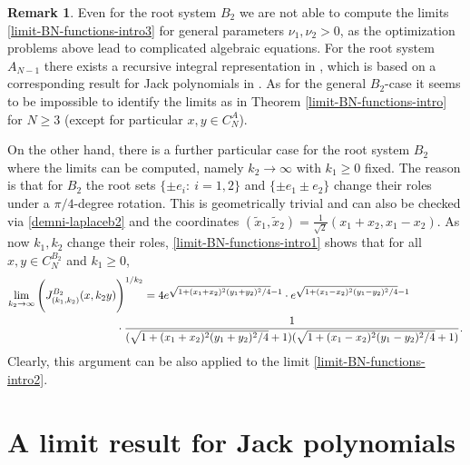\documentclass[reqno]{amsart}
\theoremstyle{plain}
\theoremstyle{definition}
\newtheorem{remark}[theorem]{Remark}
\numberwithin{equation}{section}
\begin{document}
\begin{remark} Even for the root system $B_2$ we are not able to compute the limits \eqref{limit-BN-functions-intro3}
 for general parameters $\nu_1,\nu_2>0$, as the optimization problems above lead to complicated algebraic equations.
 For the root system $A_{N-1}$ there exists a recursive integral representation in \cite{Amri},
 which is based on a corresponding result 
 for Jack polynomials in \cite{OO}. As for the general $B_2$-case it seems to be impossible to identify the limits
 as in Theorem \ref{limit-BN-functions-intro} for $N\ge3$ (except for particular $x,y\in C_N^A$).

 On the other hand, there is a further particular case for the root system $B_2$ where the limits can be computed, namely 
 $k_2\to\infty$ with $k_1\ge0$ fixed. The reason  is  that for $B_2$ the root sets
 $\{\pm e_i:\> i=1,2\}$ and $\{\pm e_1\pm e_2\}$ change their roles under a $\pi/4$-degree rotation. This is geometrically trivial and
 can also be
  checked  via \eqref{demni-laplaceb2} and the  coordinates $(\tilde x_1,\tilde x_2)=\frac{1}{\sqrt 2}(x_1+x_2, x_1-x_2)$. As now
$k_1,k_2$ change their roles,
\eqref{limit-BN-functions-intro1} shows that for all $x,y\in C_N^{B_2}$ and  $k_1\ge0$,
\begin{align}\label{rotated limit} 
\lim_{k_2 \to \infty} \Bigg( J_{(k_1,k_2)}^{B_2}(x,k_2 y)& \Bigg)^{1/k_2}
= 4e^{\sqrt{1+(x_1+x_2)^2(y_1+y_2)^2/4}-1}\cdot e^{\sqrt{1+(x_1-x_2)^2(y_1-y_2)^2/4}-1}\\
&\cdot\frac{1}{(\sqrt{1+(x_1+x_2)^2(y_1+y_2)^2/4}+1)( \sqrt{1+(x_1-x_2)^2(y_1-y_2)^2/4}+1)}.\notag\end{align}
Clearly, this argument can be also applied to the limit \eqref{limit-BN-functions-intro2}.
\end{remark}

\section{A limit result for Jack polynomials}
\end{document}
